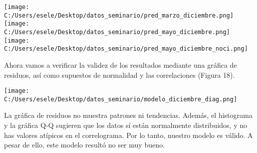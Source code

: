 \documentclass[11pt,letterpaper]{article}
\theoremstyle{definition}
\theoremstyle{theorem}
\theoremstyle{remark}
\begin{document}
	\begin{center}
		\texttt{[image: C:/Users/esele/Desktop/datos\_seminario/pred\_marzo\_diciembre.png]}
		\texttt{[image: C:/Users/esele/Desktop/datos\_seminario/pred\_mayo\_diciembre.png]}
		\texttt{[image: C:/Users/esele/Desktop/datos\_seminario/pred\_mayo\_diciembre\_noci.png]}
	\end{center}\clearpage
	\par Ahora vamos a verificar la validez de los resultados mediante una gráfica de residuos, así como supuestos de normalidad y las correlaciones (Figura 18).
	\begin{center}
		\hspace*{-1em}\texttt{[image: C:/Users/esele/Desktop/datos\_seminario/modelo\_diciembre\_diag.png]}
	\end{center}
	\par La gráfica de residuos no muestra patrones ni tendencias. Además, el histograma y la gráfica Q-Q sugieren que los datos sí están normalmente distribuidos, y no has valores atípicos en el correlograma. Por lo tanto, nuestro modelo es válido. A pesar de ello, este modelo resultó no ser muy bueno.
\end{document}
